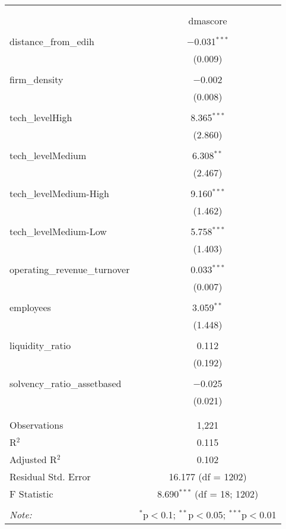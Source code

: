 
\begin{table}[!htbp] \centering 
  \caption{} 
  \label{} 
\begin{tabular}{@{\extracolsep{5pt}}lc} 
\\[-1.8ex]\hline 
\hline \\[-1.8ex] 
\\[-1.8ex] & dmascore \\ 
\hline \\[-1.8ex] 
 distance\_from\_edih & $-$0.031$^{***}$ \\ 
  & (0.009) \\ 
  & \\ 
 firm\_density & $-$0.002 \\ 
  & (0.008) \\ 
  & \\ 
 tech\_levelHigh & 8.365$^{***}$ \\ 
  & (2.860) \\ 
  & \\ 
 tech\_levelMedium & 6.308$^{**}$ \\ 
  & (2.467) \\ 
  & \\ 
 tech\_levelMedium-High & 9.160$^{***}$ \\ 
  & (1.462) \\ 
  & \\ 
 tech\_levelMedium-Low & 5.758$^{***}$ \\ 
  & (1.403) \\ 
  & \\ 
 operating\_revenue\_turnover & 0.033$^{***}$ \\ 
  & (0.007) \\ 
  & \\ 
 employees & 3.059$^{**}$ \\ 
  & (1.448) \\ 
  & \\ 
 liquidity\_ratio & 0.112 \\ 
  & (0.192) \\ 
  & \\ 
 solvency\_ratio\_assetbased & $-$0.025 \\ 
  & (0.021) \\ 
  & \\ 
\hline \\[-1.8ex] 
Observations & 1,221 \\ 
R$^{2}$ & 0.115 \\ 
Adjusted R$^{2}$ & 0.102 \\ 
Residual Std. Error & 16.177 (df = 1202) \\ 
F Statistic & 8.690$^{***}$ (df = 18; 1202) \\ 
\hline 
\hline \\[-1.8ex] 
\textit{Note:}  & \multicolumn{1}{r}{$^{*}$p$<$0.1; $^{**}$p$<$0.05; $^{***}$p$<$0.01} \\ 
\end{tabular} 
\end{table} 
